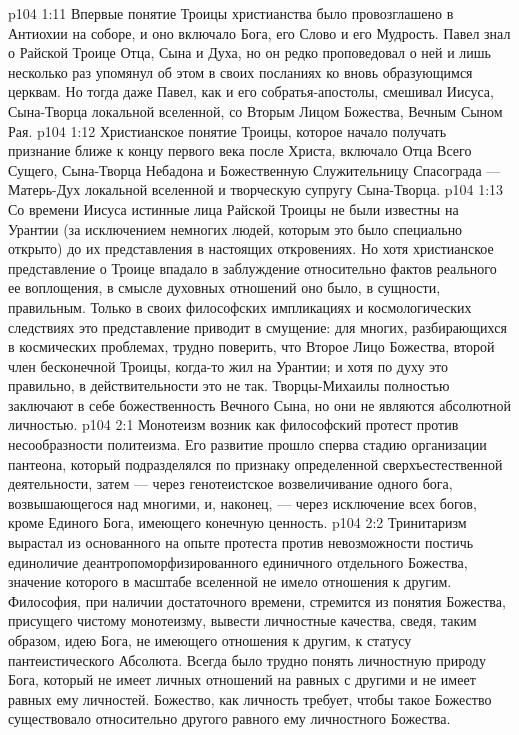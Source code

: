 \vs p104 1:11 Впервые понятие Троицы христианства было провозглашено в Антиохии на соборе, и оно включало Бога, его Слово и его Мудрость. Павел знал о Райской Троице Отца, Сына и Духа, но он редко проповедовал о ней и лишь несколько раз упомянул об этом в своих посланиях ко вновь образующимся церквам. Но тогда даже Павел, как и его собратья\hyp{}апостолы, смешивал Иисуса, Сына\hyp{}Творца локальной вселенной, со Вторым Лицом Божества, Вечным Сыном Рая.
\vs p104 1:12 Христианское понятие Троицы, которое начало получать признание ближе к концу первого века после Христа, включало Отца Всего Сущего, Сына\hyp{}Творца Небадона и Божественную Служительницу Спасограда --- Матерь\hyp{}Дух локальной вселенной и творческую супругу Сына\hyp{}Творца.
\vs p104 1:13 Со времени Иисуса истинные лица Райской Троицы не были известны на Урантии (за исключением немногих людей, которым это было специально открыто) до их представления в настоящих откровениях. Но хотя христианское представление о Троице впадало в заблуждение относительно фактов реального ее воплощения, в смысле духовных отношений оно было, в сущности, правильным. Только в своих философских импликациях и космологических следствиях это представление приводит в смущение: для многих, разбирающихся в космических проблемах, трудно поверить, что Второе Лицо Божества, второй член бесконечной Троицы, когда\hyp{}то жил на Урантии; и хотя по духу это правильно, в действительности это не так. Творцы\hyp{}Михаилы полностью заключают в себе божественность Вечного Сына, но они не являются абсолютной личностью.
\vs p104 2:1 Монотеизм возник как философский протест против несообразности политеизма. Его развитие прошло сперва стадию организации пантеона, который подразделялся по признаку определенной сверхъестественной деятельности, затем --- через генотеистское возвеличивание одного бога, возвышающегося над многими, и, наконец, --- через исключение всех богов, кроме Единого Бога, имеющего конечную ценность.
\vs p104 2:2 Тринитаризм вырастал из основанного на опыте протеста против невозможности постичь единоличие деантропоморфизированного единичного отдельного Божества, значение которого в масштабе вселенной не имело отношения к другим. Философия, при наличии достаточного времени, стремится из понятия Божества, присущего чистому монотеизму, вывести личностные качества, сведя, таким образом, идею Бога, не имеющего отношения к другим, к статусу пантеистического Абсолюта. Всегда было трудно понять личностную природу Бога, который не имеет личных отношений на равных с другими и не имеет равных ему личностей. Божество, как личность требует, чтобы такое Божество существовало относительно другого равного ему личностного Божества.
